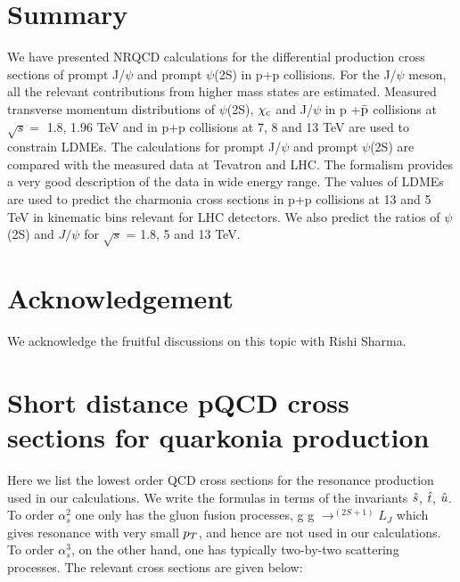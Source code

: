 \documentclass[aps,prc,preprint,superscriptaddress,showpacs,showkeys,amsmath]{revtex4-1}
\begin{document}
\section{Summary}
  We have presented NRQCD calculations for the differential production 
cross sections of prompt J/$\psi$ and prompt $\psi$(2S) in  p+p collisions.
For the J/$\psi$ meson, all the relevant contributions from higher mass states 
are estimated. 
 Measured transverse momentum distributions of $\psi$(2S), $\chi_{\rm c}$ and J/$\psi$ 
in p +{$\bar {\rm p}$} collisions at $\sqrt{s}=$ 1.8, 1.96 TeV and in p+p collisions at 
7, 8 and 13 TeV are used to constrain LDMEs. 
 The calculations for  prompt J/$\psi$ and prompt $\psi$(2S) are compared with the measured 
data at Tevatron and LHC. 
  The formalism provides a very good description of the data in wide energy range. 
The values of LDMEs are used to predict the charmonia cross sections in p+p collisions 
at 13 and 5 TeV in kinematic bins relevant for LHC detectors. We also predict the ratios
of $\psi$(2S) and $J/\psi$ for $\sqrt{s}$ = 1.8, 5 and 13 TeV. 



\section*{Acknowledgement}
 We acknowledge the fruitful discussions on this topic with Rishi Sharma.

\newpage
\appendix

\section{Short distance pQCD cross sections for quarkonia production}
\label{section:pqcd}
  Here we list the lowest order QCD cross sections for the resonance production used 
in our calculations. We write the formulas in terms of the invariants ${\hat{s}}$, ${\hat{t}}$, ${\hat{u}}$.
 To order $\alpha_{s}^{2}$ one only has the gluon fusion processes, 
g g $\rightarrow ^{(2S+1)}L_{J}$ which gives resonance with very small $p_{T}$, 
and hence are not used in our calculations.
  To order $\alpha_{s}^{3}$, on the other hand, one has typically two-by-two 
scattering processes. The relevant cross sections are given below:
\end{document}
